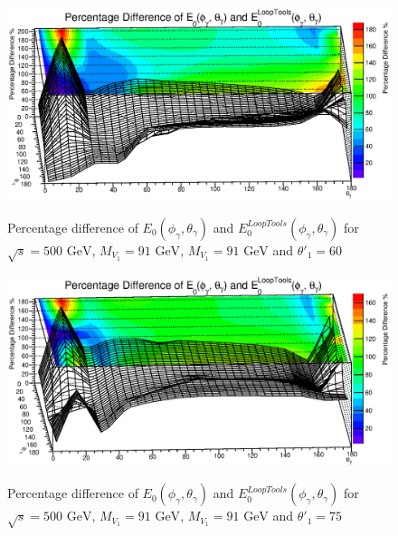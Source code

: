 \begin{figure}
	\begin{center}
		\includegraphics[scale=0.55]{60PD3.eps}\\
	\caption{ Percentage difference of $E_0(\phi_\gamma,\theta_\gamma)$ and $E_0^{LoopTools}(\phi_\gamma,\theta_\gamma)$ for $\sqrt{s}=500\text{ GeV}$, $M_{V_1}=91\text{ GeV}$, $M_{V_1}=91\text{ GeV}$ and $\theta'_1=60$ }
	\end{center}
\end{figure}

\begin{figure}
	\begin{center}
		\includegraphics[scale=0.55]{75PD3.eps}\\
	\caption{ Percentage difference of $E_0(\phi_\gamma,\theta_\gamma)$ and $E_0^{LoopTools}(\phi_\gamma,\theta_\gamma)$ for $\sqrt{s}=500\text{ GeV}$, $M_{V_1}=91\text{ GeV}$, $M_{V_1}=91\text{ GeV}$ and $\theta'_1=75$ }
	\end{center}
\end{figure}

